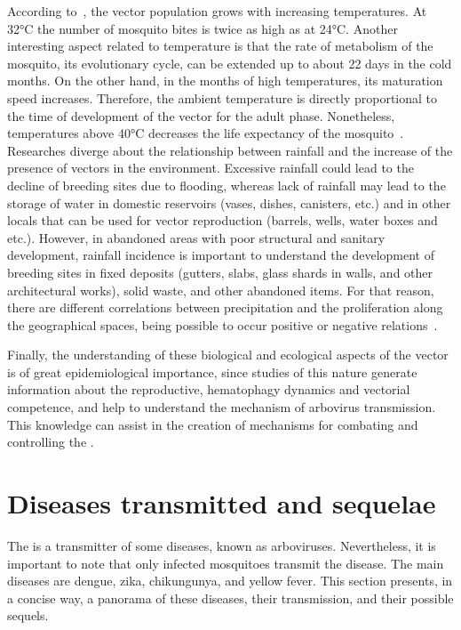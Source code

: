 According to~\cite{focks1995simulation}, the vector population grows with increasing temperatures. At 32°C the number of mosquito bites is twice as high as at 24°C.
Another interesting aspect related to temperature is that the rate of metabolism of the mosquito, its evolutionary cycle, can be extended up to about 22 days in the cold months.
On the other hand, in the months of high temperatures, its maturation speed increases.
Therefore, the ambient temperature is directly proportional to the time of development of the vector for the adult phase.
Nonetheless, temperatures above 40°C decreases the life expectancy of the mosquito~\cite{patz1998dengue}.
Researches diverge about the relationship between rainfall and the increase of the presence of vectors in the environment.
Excessive rainfall could lead to the decline of breeding sites due to flooding, whereas lack of rainfall may lead to the storage of water in domestic reservoirs (vases, dishes, canisters, etc.) and in other locals that can be used for vector reproduction (barrels, wells, water boxes and etc.).
However, in abandoned areas with poor structural and sanitary development, rainfall incidence is important to understand the development of breeding sites in fixed deposits (gutters, slabs, glass shards in walls, and other architectural works), solid waste, and other abandoned items.
For that reason, there are different correlations between precipitation and the \Aedes proliferation along the geographical spaces, being possible to occur positive or negative relations~\cite{arcari2007regional}.

Finally, the understanding of these biological and ecological aspects of the vector is of great epidemiological importance, since studies of this nature generate information about the reproductive, hematophagy dynamics and vectorial competence, and help to understand the mechanism of arbovirus transmission.
This knowledge can assist in the creation of mechanisms for combating and controlling the \Aedes.



\section{Diseases transmitted and sequelae}
%
The \Aedes is a transmitter of some diseases, known as arboviruses.
Nevertheless, it is important to note that only infected mosquitoes transmit the disease.
The main diseases are dengue, zika, chikungunya, and yellow fever.
This section presents, in a concise way, a panorama of these diseases, their transmission, and their possible sequels.

